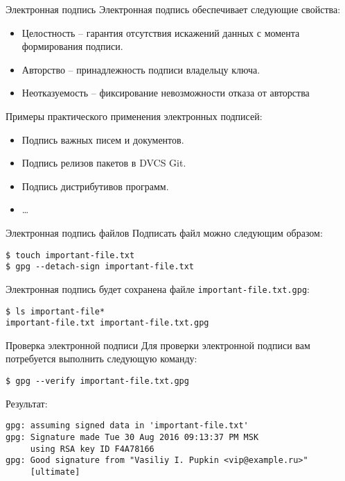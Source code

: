 \documentclass[presentation]{beamer}
\begin{document}
\begin{frame}[fragile]{Электронная подпись}
  Электронная подпись обеспечивает следующие свойства:
  \begin{itemize}
  \item \alert{Целостность} -- гарантия отсутствия искажений данных с
    момента формирования подписи.
  \item \alert{Авторство} -- принадлежность подписи владельцу ключа.
  \item \alert{Неотказуемость} -- фиксирование невозможности отказа от
    авторства
  \end{itemize}

  \vspace{5 mm}

  Примеры практического применения электронных подписей:
  \begin{itemize}
  \item Подпись важных писем и документов.
  \item Подпись релизов пакетов в DVCS Git.
  \item Подпись дистрибутивов программ.
  \item \ldots{}
  \end{itemize}
\end{frame}

\begin{frame}[fragile]{Электронная подпись файлов}
  Подписать файл можно следующим образом:
\begin{verbatim}
$ touch important-file.txt
$ gpg --detach-sign important-file.txt
\end{verbatim}

  Электронная подпись будет сохранена файле
  \texttt{important-file.txt.gpg}:
\begin{verbatim}
$ ls important-file*
important-file.txt important-file.txt.gpg
\end{verbatim}
\end{frame}

\begin{frame}[fragile]{Проверка электронной подписи}
  Для проверки электронной подписи вам потребуется выполнить следующую
  команду:
\begin{verbatim}
$ gpg --verify important-file.txt.gpg
\end{verbatim}

  Результат:
  \footnotesize
\begin{verbatim}
gpg: assuming signed data in 'important-file.txt'
gpg: Signature made Tue 30 Aug 2016 09:13:37 PM MSK
     using RSA key ID F4A78166
gpg: Good signature from "Vasiliy I. Pupkin <vip@example.ru>"
     [ultimate]
\end{verbatim}
  \normalsize
\end{frame}
\end{document}
